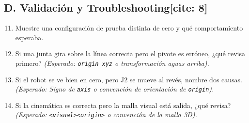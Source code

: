 \documentclass[11pt, a4paper]{article}
\begin{document}
\subsection*{D. Validación y Troubleshooting[cite: 8]}
\begin{enumerate}
    \setcounter{enumi}{10}
    \item Muestre una configuración de prueba distinta de cero y qué comportamiento esperaba.
    \item Si una junta gira sobre la línea correcta pero el pivote es erróneo, ¿qué revisa primero? \textit{(Esperado: \texttt{origin xyz} o transformación aguas arriba).}
    \item Si el robot se ve bien en cero, pero J2 se mueve al revés, nombre dos causas. \textit{(Esperado: Signo de \texttt{axis} o convención de orientación de \texttt{origin}).}
    \item Si la cinemática es correcta pero la malla visual está salida, ¿qué revisa? \textit{(Esperado: \texttt{<visual><origin>} o convención de la malla 3D).}
\end{enumerate}
\end{document}

